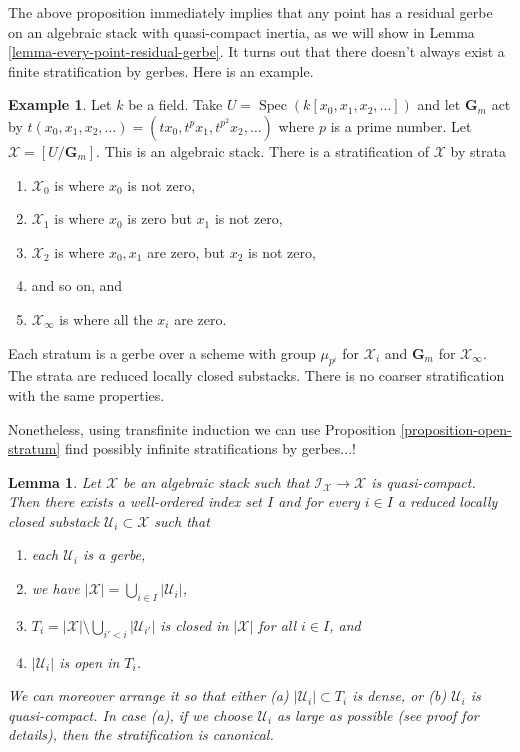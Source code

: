 \documentclass{stacks-project}
\theoremstyle{plain}
\newtheorem{lemma}[subsection]{Lemma}
\theoremstyle{definition}
\newtheorem{example}[subsection]{Example}
\theoremstyle{remark}
\numberwithin{equation}{subsection}
\def\Spec{\mathop{\mathrm{Spec}}}
\begin{document}
\noindent
The above proposition immediately implies that any point has a residual
gerbe on an algebraic stack with quasi-compact inertia, as we will show in
Lemma \ref{lemma-every-point-residual-gerbe}.
It turns out that there doesn't always exist a finite stratification
by gerbes. Here is an example.

\begin{example}
\label{example-infinite-stratification}
Let $k$ be a field.
Take $U = \Spec(k[x_0, x_1, x_2, \ldots])$
and let $\mathbf{G}_m$ act by
$t(x_0, x_1, x_2, \ldots) = (tx_0, t^p x_1, t^{p^2} x_2, \ldots)$
where $p$ is a prime number. Let $\mathcal{X} = [U/\mathbf{G}_m]$.
This is an algebraic stack. There is a stratification of $\mathcal{X}$
by strata
\begin{enumerate}
\item $\mathcal{X}_0$ is where $x_0$ is not zero,
\item $\mathcal{X}_1$ is where $x_0$ is zero but $x_1$ is not zero,
\item $\mathcal{X}_2$ is where $x_0, x_1$ are zero, but $x_2$ is not zero,
\item and so on, and
\item $\mathcal{X}_{\infty}$ is where all the $x_i$ are zero.
\end{enumerate}
Each stratum is a gerbe over a scheme with group $\mu_{p^i}$ for
$\mathcal{X}_i$ and $\mathbf{G}_m$ for $\mathcal{X}_{\infty}$.
The strata are reduced locally closed substacks. There is no coarser
stratification with the same properties.
\end{example}

\noindent
Nonetheless, using transfinite induction we can use
Proposition \ref{proposition-open-stratum}
find possibly infinite stratifications by gerbes...!

\begin{lemma}
\label{lemma-every-point-in-a-stratum}
Let $\mathcal{X}$ be an algebraic stack such that
$\mathcal{I}_\mathcal{X} \to \mathcal{X}$ is quasi-compact.
Then there exists a well-ordered index set $I$ and for every $i \in I$
a reduced locally closed substack $\mathcal{U}_i \subset \mathcal{X}$ such that
\begin{enumerate}
\item each $\mathcal{U}_i$ is a gerbe,
\item we have $|\mathcal{X}| = \bigcup_{i \in I} |\mathcal{U}_i|$,
\item $T_i = |\mathcal{X}| \setminus \bigcup_{i' < i} |\mathcal{U}_{i'}|$
is closed in $|\mathcal{X}|$ for all $i \in I$, and
\item $|\mathcal{U}_i|$ is open in $T_i$.
\end{enumerate}
We can moreover arrange it so that either (a) $|\mathcal{U}_i| \subset T_i$
is dense, or (b) $\mathcal{U}_i$ is quasi-compact. In case (a), if
we choose $\mathcal{U}_i$ as large as possible (see proof for details), then
the stratification is canonical.
\end{lemma}
\end{document}
